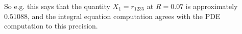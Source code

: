 \documentclass[12pt,letterpaper,reqno]{article}
\numberwithin{equation}{section}
\newcommand{\ti}[1]{\textit{#1}}
\newcommand{\insfig}[2]{

\medskip
\noindent
\begin{minipage}{\linewidth}

\makebox[\linewidth]{\texttt{[image: figures/\#1-crop.pdf]}}

\end{minipage}
\medskip

}
\begin{document}
So e.g. this says that the quantity
$X_1 = r_{1235}$ at $R = 0.07$ is approximately
$0.51088$, and the integral equation computation agrees with the PDE computation 
to this precision.


\end{document}
